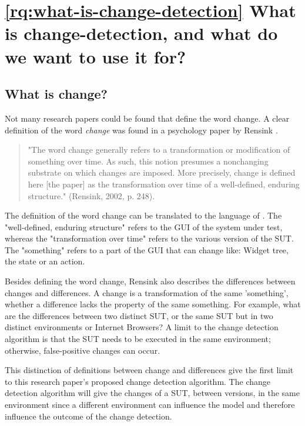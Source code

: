 \section{\ref{rq:what-is-change-detection} What is change-detection, and what do we want to use it for?}

\subsection{What is change?} \label{what-is-change}

Not many research papers could be found that define the word change. A clear definition of the word \textit{change} was found in a psychology paper by Rensink \cite{rensink2002change}.

\begin{quote}
    "The word change generally refers to a transformation or modification of something over time. As such, this notion presumes a nonchanging substrate on which changes are imposed. More precisely, change is defined here [the paper] as the transformation over time of a well-defined, enduring structure." (Rensink, 2002, p. 248).
\end{quote}

The definition of the word change can be translated to the language of \testar. The "well-defined, enduring structure" refers to the GUI of the system under test, whereas the "transformation over time" refers to the various version of the SUT. The "something" refers to a part of the GUI that can change like: Widget tree, the state or an action. 

Besides defining the word change, Rensink also describes the differences between changes and differences. A change is a transformation of the same 'something', whether a difference lacks the property of the same something. For example, what are the differences between two distinct SUT, or the same SUT but in two distinct environments or Internet Browsers? A limit to the change detection algorithm is that the SUT needs to be executed in the same environment; otherwise, false-positive changes can occur.

This distinction of definitions between change and differences give the first limit to this research paper's proposed change detection algorithm. The change detection algorithm will give the changes of a SUT, between versions, in the same environment since a different environment can influence the model and therefore influence the outcome of the change detection.

